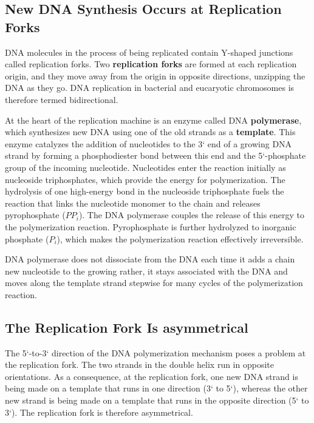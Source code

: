 \subsection{New DNA Synthesis Occurs at Replication Forks}

DNA molecules in the process of being replicated contain Y-shaped junctions
called replication forks. Two \textbf{replication forks} are formed at each replication origin, and
they move away from the origin in opposite directions, unzipping the DNA
as they go. DNA replication in bacterial and eucaryotic chromosomes
is therefore termed bidirectional.

At the heart of the replication machine is an enzyme called DNA
\textbf{polymerase}, which synthesizes new DNA using one of the old strands
as a \textbf{template}. This enzyme catalyzes the addition of nucleotides to the 3`
end of a growing DNA strand by forming a phosphodiester bond between
this end and the 5`-phosphate group of the incoming nucleotide.
Nucleotides enter the reaction initially as nucleoside triphosphates,
which provide the energy for polymerization. The hydrolysis of one high-energy
bond in the nucleoside triphosphate fuels the reaction that links
the nucleotide monomer to the chain and releases pyrophosphate ($PP_{i}$).
The DNA polymerase couples the release of this energy to the polymerization
reaction. Pyrophosphate is further hydrolyzed to inorganic
phosphate ($P_i$), which makes the polymerization reaction effectively irreversible.

DNA polymerase does not dissociate from the DNA each time it adds a chain
new nucleotide to the growing rather, it stays associated with the
DNA and moves along the template strand stepwise for many cycles of
the polymerization reaction.

\subsection{The Replication Fork Is asymmetrical}

The 5`-to-3` direction of the DNA polymerization mechanism poses a
problem at the replication fork.
The two strands in the double helix run in
opposite orientations. As a consequence, at the replication fork, one new
DNA strand is being made on a template that runs in one direction (3`
to 5`), whereas the other new strand is being made on a template that
runs in the opposite direction (5` to 3`). The replication fork is therefore
asymmetrical.


